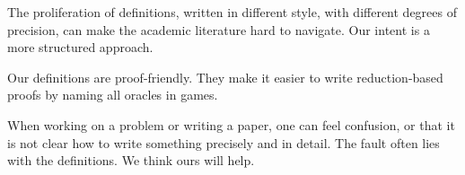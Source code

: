 The proliferation of definitions, written in different style, with different degrees of precision, can make the academic literature hard to navigate. Our intent is a more structured approach.

Our definitions are proof-friendly. They make it easier to write reduction-based proofs by naming all oracles in games.

When working on a problem or writing a paper, one can feel confusion, or that it is not clear how to write something precisely and in detail. The fault often lies with the definitions. We think ours will help.



 




